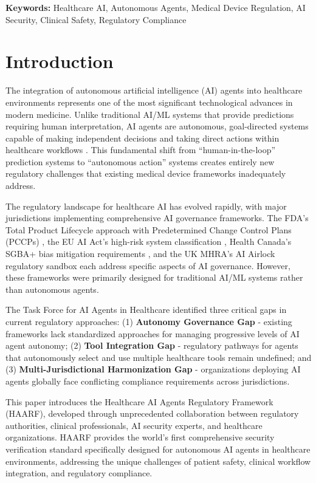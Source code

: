 \documentclass[11pt]{article}
\begin{document}
\textbf{Keywords:} Healthcare AI, Autonomous Agents, Medical Device Regulation, AI Security, Clinical Safety, Regulatory Compliance

\clearpage %

\section{Introduction}

The integration of autonomous artificial intelligence (AI) agents into healthcare environments represents one of the most significant technological advances in modern medicine. Unlike traditional AI/ML systems that provide predictions requiring human interpretation, AI agents are autonomous, goal-directed systems capable of making independent decisions and taking direct actions within healthcare workflows \cite{russell2016artificial}. This fundamental shift from ``human-in-the-loop'' prediction systems to ``autonomous action'' systems creates entirely new regulatory challenges that existing medical device frameworks inadequately address.

The regulatory landscape for healthcare AI has evolved rapidly, with major jurisdictions implementing comprehensive AI governance frameworks. The FDA's Total Product Lifecycle approach with Predetermined Change Control Plans (PCCPs) \cite{fda2021aiml}, the EU AI Act's high-risk system classification \cite{eu2024aiact}, Health Canada's SGBA+ bias mitigation requirements \cite{healthcanada2021sgba}, and the UK MHRA's AI Airlock regulatory sandbox \cite{mhra2023aiairlock} each address specific aspects of AI governance. However, these frameworks were primarily designed for traditional AI/ML systems rather than autonomous agents.

The Task Force for AI Agents in Healthcare identified three critical gaps in current regulatory approaches: (1) \textbf{Autonomy Governance Gap} - existing frameworks lack standardized approaches for managing progressive levels of AI agent autonomy; (2) \textbf{Tool Integration Gap} - regulatory pathways for agents that autonomously select and use multiple healthcare tools remain undefined; and (3) \textbf{Multi-Jurisdictional Harmonization Gap} - organizations deploying AI agents globally face conflicting compliance requirements across jurisdictions.

This paper introduces the Healthcare AI Agents Regulatory Framework (HAARF), developed through unprecedented collaboration between regulatory authorities, clinical professionals, AI security experts, and healthcare organizations. HAARF provides the world's first comprehensive security verification standard specifically designed for autonomous AI agents in healthcare environments, addressing the unique challenges of patient safety, clinical workflow integration, and regulatory compliance.
\end{document}

